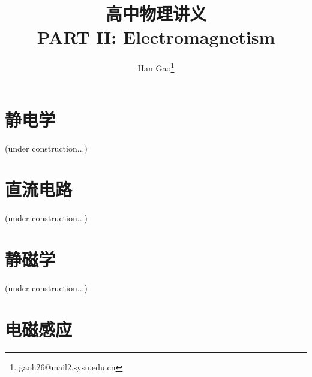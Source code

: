 \documentclass[a4paper,9pt]{ctexart}
\title{高中物理讲义\\ PART II: Electromagnetism}
\author{Han Gao\footnote{gaoh26@mail2.sysu.edu.cn}}
\begin{document}
\maketitle
\tableofcontents
\section{静电学}
(under construction...)
\section{直流电路}
(under construction...)
\section{静磁学}
(under construction...)
\newpage
\section{电磁感应}
\end{document}
